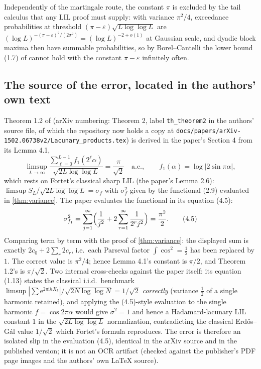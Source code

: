 \documentclass[11pt,oneside]{article}
\theoremstyle{definition}
\theoremstyle{remark}
\newcommand{\e}{\mathrm e}
\newcommand{\ii}{\mathrm i}
\newcommand{\smallo}{o}
\begin{document}
Independently of the martingale route, the constant $\pi$ is excluded by
the tail calculus that any LIL proof must supply: with variance
$\pi^2/4$, exceedance probabilities at threshold
$(\pi-\varepsilon)\sqrt{L\log\log L}$ are
$(\log L)^{-(\pi-\varepsilon)^2/(2\sigma^2)}=(\log L)^{-2+\smallo(1)}$
at Gaussian scale, and dyadic block maxima then have summable
probabilities, so by Borel--Cantelli the lower bound (1.7) of
\cite{ahl2017} cannot hold with the constant $\pi-\varepsilon$
infinitely often.

\subsection{The source of the error, located in the authors' own text}

Theorem 1.2 of \cite{ahl2017} (arXiv numbering: Theorem 2, label
\texttt{th\_theorem2} in the authors' source file, of which the
repository now holds a copy at
\nolinkurl{docs/papers/arXiv-1502.06738v2/Lacunary_products.tex}) is
derived in the paper's Section 4 from its Lemma 4.1,
\[
 \limsup_{L\to\infty}
 \frac{\sum_{\ell=0}^{L-1}f_1(2^\ell\alpha)}{\sqrt{2L\log\log L}}
 =\frac{\pi}{\sqrt2}
 \quad\text{a.e.},\qquad f_1(\alpha)=\log|2\sin\pi\alpha|,
\]
which rests on Fortet's classical sharp LIL (the paper's Lemma 2.6):
$\limsup S_L/\sqrt{2L\log\log L}=\sigma_f$ with $\sigma_f^2$ given by the
functional (2.9) evaluated in \cref{thm:variance}.  The paper
evaluates the functional in its equation (4.5):
\[
 \sigma_{f_1}^2
 =\sum_{j=1}^{\infty}\Bigl(\frac{1}{j^2}
 +2\sum_{r=1}^{\infty}\frac{1}{2^rj^2}\Bigr)
 =\frac{\pi^2}{2}.
 \tag{4.5}
\]
Comparing term by term with the proof of \cref{thm:variance}: the
displayed sum is exactly $2c_0+2\sum_r2c_r$, i.e.\ each Parseval factor
$\int\cos^2=\tfrac12$ has been replaced by $1$.  The correct value is
$\pi^2/4$; hence Lemma 4.1's constant is $\pi/2$, and Theorem 1.2's is
$\pi/\sqrt2$.  Two internal cross-checks against the paper itself:
its equation (1.13) states the classical i.i.d.\ benchmark
$\limsup|\sum\e^{2\pi\ii hX_k}|/\sqrt{2N\log\log N}=1/\sqrt2$
\emph{correctly} (variance $\tfrac12$ of a single harmonic retained), and
applying the (4.5)-style evaluation to the single harmonic
$f=\cos2\pi\alpha$ would give $\sigma^2=1$ and hence a Hadamard-lacunary
LIL constant $1$ in the $\sqrt{2L\log\log L}$ normalization,
contradicting the classical Erd\H os--G\'al value $1/\sqrt2$ which
Fortet's formula reproduces.  The error is therefore an isolated slip in
the evaluation (4.5), identical in the arXiv source and in the published
version; it is not an OCR artifact (checked against the publisher's PDF
page images and the authors' own \LaTeX{} source).
\end{document}
